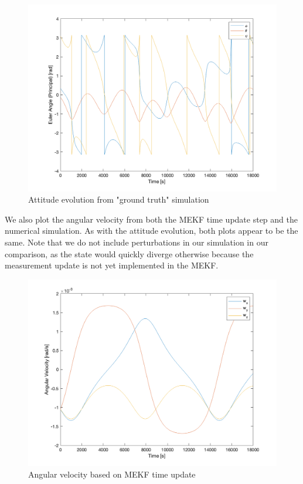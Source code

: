 \begin{figure}[H]
\centering
\includegraphics[scale=0.6]{Images/ps7_problem5a_angle_sim.png}
\caption{Attitude evolution from "ground truth" simulation}
\label{fig:ps7_problem5a_angle_sim}
\end{figure}

We also plot the angular velocity from both the MEKF time update step and the numerical simulation. As with the attitude evolution, both plots appear to be the same. Note that we do not include perturbations in our simulation in our comparison, as the state would quickly diverge otherwise because the measurement update is not yet implemented in the MEKF.

\begin{figure}[H]
\centering
\includegraphics[scale=0.6]{Images/ps7_problem5a_angvel_est.png}
\caption{Angular velocity based on MEKF time update}
\label{fig:ps7_problem5a_angvel_est}
\end{figure}

